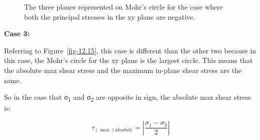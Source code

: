\documentclass[
  letterpaper,
  DIV=11,
  numbers=noendperiod]{scrreprt}
\theoremstyle{definition}
\theoremstyle{remark}
\begin{document}
\begin{figure}


\caption{\label{fig-12.14}The three planes represented on Mohr's circle
for the case where both the principal stresses in the xy plane are
negative.}

\end{figure}%

\textbf{Case 3:}

Referring to Figure~\ref{fig-12.15}, this case is different than the
other two because in this case, the Mohr's circle for the xy plane is
the largest circle. This means that the absolute max shear stress and
the maximum in-plane shear stress are the same.

So in the case that σ\textsubscript{1} and σ\textsubscript{2} are
opposite in sign, the absolute max shear stress is:

\[
\tau_{(\max )absolute}=\left|\frac{\sigma_1-\sigma_2}{2}\right|
\]
\end{document}
